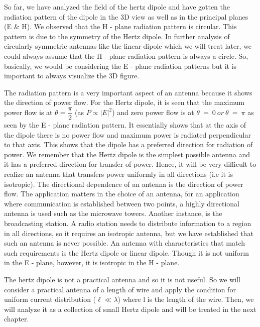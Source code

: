 So far, we have analyzed the field of the hertz dipole and have gotten the radiation pattern of the dipole in the 3D view as well as in the principal planes (E \& H). We observed that the H - plane radiation pattern is circular. This pattern is due to the symmetry of the Hertz dipole. In further analysis of circularly symmetric antennas like the linear dipole which we will treat later, we could always assume that the H - plane radiation pattern is always a circle. So, basically, we would be considering the E - plane radiation patterns but it is important to always visualize the 3D figure.

The radiation pattern is a very important aspect of an antenna because it shows the direction of power flow. For the Hertz dipole, it is seen that the maximum power flow is at $\theta = \dfrac{\pi}{2}$ (as $P \propto  |E|^2 $) and zero power flow is at $\theta\ =\ 0 \ or\ \theta\ =\ \pi $ as seen by the E - plane radiation pattern. It essentially shows that at the axis of the dipole there is no power flow and maximum power is radiated perpendicular to that axis. This shows that the dipole has a preferred direction for radiation of power. We remember that the Hertz dipole is the simplest possible antenna and it has a preferred direction for transfer of power. Hence, it will be very difficult to realize an antenna that transfers power uniformly in all directions (i.e it is isotropic). The directional dependence of an antenna is the direction of power flow. The application matters in the choice of an antenna, for an application where communication is established between two points, a highly directional antenna is used such as the microwave towers. Another instance, is the broadcasting station. A radio station needs to distribute information to a region in all directions, so it requires an isotropic antenna, but we have established that such an antenna is never possible. An antenna with characteristics that match such requirements is the Hertz dipole or linear dipole. Though it is not uniform in the E - plane, however, it is isotropic in the H - plane. 

The hertz dipole is not a practical antenna and so it is not useful. So we will consider a practical antenna of a length of wire and apply the condition for uniform current distribution ($\ell \ll \lambda$) where l is the length of the wire. Then, we will analyze it as a collection of small Hertz dipole and will be treated in the next chapter.